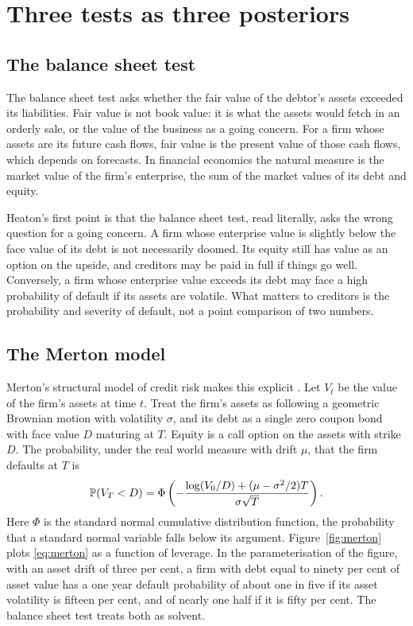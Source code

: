 \section{Three tests as three posteriors}

\subsection{The balance sheet test}

The balance sheet test asks whether the fair value of the debtor's assets exceeded its liabilities. Fair value is not book value: it is what the assets would fetch in an orderly sale, or the value of the business as a going concern. For a firm whose assets are its future cash flows, fair value is the present value of those cash flows, which depends on forecasts. In financial economics the natural measure is the market value of the firm's enterprise, the sum of the market values of its debt and equity.

Heaton's first point is that the balance sheet test, read literally, asks the wrong question for a going concern. A firm whose enterprise value is slightly below the face value of its debt is not necessarily doomed. Its equity still has value as an option on the upside, and creditors may be paid in full if things go well. Conversely, a firm whose enterprise value exceeds its debt may face a high probability of default if its assets are volatile. What matters to creditors is the probability and severity of default, not a point comparison of two numbers.

\subsection{The Merton model}

Merton's structural model of credit risk makes this explicit \citep{merton1974}. Let $V_t$ be the value of the firm's assets at time $t$. Treat the firm's assets as following a geometric Brownian motion with volatility $\sigma$, and its debt as a single zero coupon bond with face value $D$ maturing at $T$. Equity is a call option on the assets with strike $D$. The probability, under the real world measure with drift $\mu$, that the firm defaults at $T$ is
\begin{equation}
\mathbb{P}(V_T < D) = \Phi\left(-\frac{\log(V_0/D) + (\mu - \sigma^2/2)T}{\sigma\sqrt{T}}\right).
\label{eq:merton}
\end{equation}
Here $\Phi$ is the standard normal cumulative distribution function, the probability that a standard normal variable falls below its argument. Figure~\ref{fig:merton} plots \eqref{eq:merton} as a function of leverage. In the parameterisation of the figure, with an asset drift of three per cent, a firm with debt equal to ninety per cent of asset value has a one year default probability of about one in five if its asset volatility is fifteen per cent, and of nearly one half if it is fifty per cent. The balance sheet test treats both as solvent.

